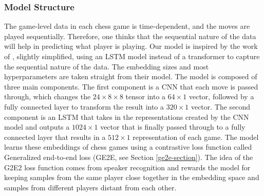 \subsubsection{Model Structure}
The game-level data in each chess game is time-dependent, and the moves are played sequentially. Therefore, one thinks that the sequential nature of the data will help in predicting what player is playing. Our model is inspired by the work of \cite{main_article}, slightly simplified, using an LSTM model instead of a transformer to capture the sequential nature of the data. The embedding sizes and most hyperparameters are taken straight from their model. The model is composed of three main components. The first component is a CNN that each move is passed through, which changes the $24\times 8 \times 8$ tensor into a $64\times 1$ vector, followed by a fully connected layer to transform the result into a $320\times 1$ vector. The second component is an LSTM that takes in the representations created by the CNN model and outputs a $1024\times 1$ vector that is finally passed through to a fully connected layer that results in a $512\times 1$ representation of each game. The model learns these embeddings of chess games using a contrastive loss function called Generalized end-to-end loss (GE2E, see Section \ref{ge2e-section}). The idea of the G2E2 loss function comes from speaker recognition and rewards the model for keeping samples from the same player close together in the embedding space and samples from different players distant from each other.
